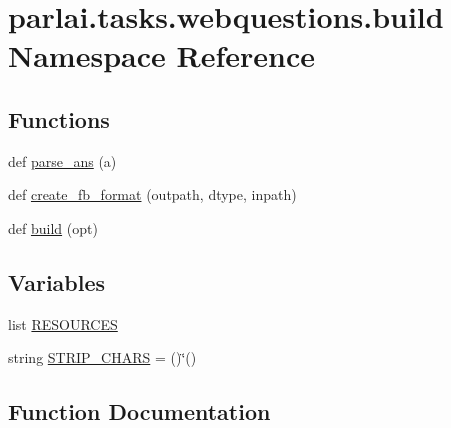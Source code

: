 \hypertarget{namespaceparlai_1_1tasks_1_1webquestions_1_1build}{}\section{parlai.\+tasks.\+webquestions.\+build Namespace Reference}
\label{namespaceparlai_1_1tasks_1_1webquestions_1_1build}
\subsection*{Functions}
\begin{DoxyCompactItemize}
\item 
def \hyperlink{namespaceparlai_1_1tasks_1_1webquestions_1_1build_a969c68eeef096e477def172c88928eb3}{parse\+\_\+ans} (a)
\item 
def \hyperlink{namespaceparlai_1_1tasks_1_1webquestions_1_1build_aba751402cc3a79acbe7517832498a7e6}{create\+\_\+fb\+\_\+format} (outpath, dtype, inpath)
\item 
def \hyperlink{namespaceparlai_1_1tasks_1_1webquestions_1_1build_a175826dcfcbe18189c4c668b1b335239}{build} (opt)
\end{DoxyCompactItemize}
\subsection*{Variables}
\begin{DoxyCompactItemize}
\item 
list \hyperlink{namespaceparlai_1_1tasks_1_1webquestions_1_1build_a8e31c90df1a66040d2a9656d809fe41a}{R\+E\+S\+O\+U\+R\+C\+ES}
\item 
string \hyperlink{namespaceparlai_1_1tasks_1_1webquestions_1_1build_a199339b3ddbfe999e55a41d81af81def}{S\+T\+R\+I\+P\+\_\+\+C\+H\+A\+RS} = \textquotesingle{} ()\char`\"{}()\textquotesingle{}
\end{DoxyCompactItemize}


\subsection{Function Documentation}
\mbox{\label{namespaceparlai_1_1tasks_1_1webquestions_1_1build_a175826dcfcbe18189c4c668b1b335239}} 
